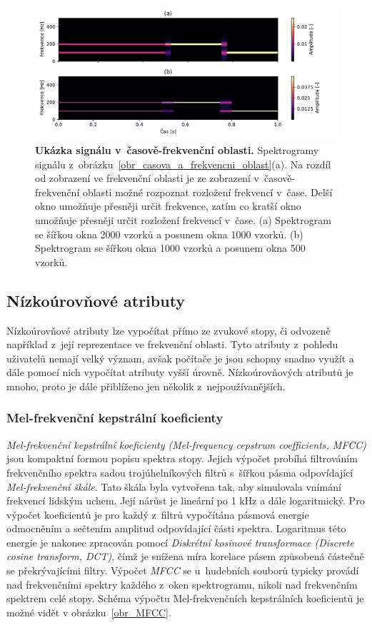 \begin{figure}[h]
    \centering
    \includegraphics[width=\textwidth]{obrazky/spektrogramy.pdf}
    \caption{\textbf{Ukázka signálu v~časově-frekvenční oblasti.} Spektrogramy signálu z~obrázku~\ref{obr_casova_a_frekvencni_oblast}(a). Na rozdíl od zobrazení ve frekvenční oblasti je ze zobrazení v~časově-frekvenční oblasti možné rozpoznat rozložení frekvencí v~čase. Delší okno umožňuje přesněji určit frekvence, zatím co kratší okno umožňuje přesněji určit rozložení frekvencí v~čase. (a) Spektrogram se šířkou okna 2000 vzorků a posunem okna 1000 vzorků. (b) Spektrogram se šířkou okna 1000 vzorků a posunem okna 500 vzorků.}
    \label{obr_spektrogramy}
\end{figure}

\clearpage

\subsection*{Nízkoúrovňové atributy}
\label{nizkourovnove_atributy}
Nízkoúrovňové atributy lze vypočítat přímo ze zvukové stopy, či odvozeně například z~její reprezentace ve frekvenční oblasti. Tyto atributy z~pohledu uživatelů nemají velký význam, avšak počítače je jsou schopny snadno využít a dále pomocí nich vypočítat atributy vyšší úrovně. Nízkoúrovňových atributů je mnoho, proto je dále přiblíženo jen několik z~nejpoužívanějších.\cite{MIR}

\subsubsection*{Mel-frekvenční kepstrální koeficienty}
\textit{Mel-frekvenční kepstrální koeficienty (Mel-frequency cepstrum coefficients, MFCC)} jsou kompaktní formou popisu spektra stopy. Jejich výpočet probíhá filtrováním frekvenčního spektra sadou trojúhelníkových filtrů s~šířkou pásma odpovídající \textit{Mel-frekvenční škále}. Tato škála byla vytvořena tak, aby simulovala vnímání frekvencí lidským uchem. Její nárůst je lineární po 1 kHz a dále logaritmický. Pro výpočet koeficientů je pro každý z~filtrů vypočítána pásmová energie odmocněním a sečtením amplitud odpovídající části spektra. Logaritmus této energie je nakonec zpracován pomocí \textit{Diskrétní kosinové transformace (Discrete cosine transform, DCT)}, čímž je snížena míra korelace pásem způsobená částečně se překrývajícími filtry. Výpočet \textit{MFCC} se u~hudebních souborů typicky provádí nad frekvenčními spektry každého z~oken spektrogramu, nikoli nad frekvenčním spektrem celé stopy. Schéma výpočtu Mel-frekvenčních kepstrálních koeficientů je možné vidět v obrázku~\ref{obr_MFCC}.\cite{MIR}\cite{low_level}\cite{aca}

